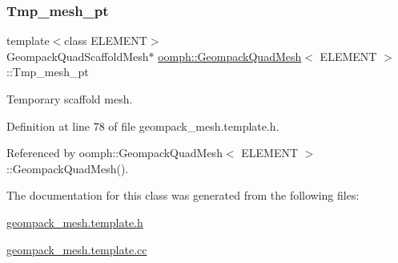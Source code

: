 \subsubsection{\texorpdfstring{Tmp\+\_\+mesh\+\_\+pt}{Tmp\_mesh\_pt}}
{\footnotesize\ttfamily template$<$class E\+L\+E\+M\+E\+NT$>$ \\
Geompack\+Quad\+Scaffold\+Mesh$\ast$ \hyperlink{classoomph_1_1GeompackQuadMesh}{oomph\+::\+Geompack\+Quad\+Mesh}$<$ E\+L\+E\+M\+E\+NT $>$\+::Tmp\+\_\+mesh\+\_\+pt\hspace{0.3cm}{\ttfamily [private]}}



Temporary scaffold mesh. 



Definition at line 78 of file geompack\+\_\+mesh.\+template.\+h.



Referenced by oomph\+::\+Geompack\+Quad\+Mesh$<$ E\+L\+E\+M\+E\+N\+T $>$\+::\+Geompack\+Quad\+Mesh().



The documentation for this class was generated from the following files\+:\begin{DoxyCompactItemize}
\item 
\hyperlink{geompack__mesh_8template_8h}{geompack\+\_\+mesh.\+template.\+h}\item 
\hyperlink{geompack__mesh_8template_8cc}{geompack\+\_\+mesh.\+template.\+cc}\end{DoxyCompactItemize}
